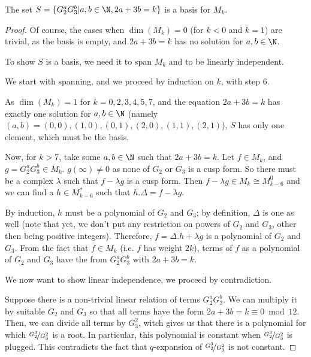 \begin{theorem}
    The set $S = \{G_2^aG_3^b | a,b \in \N, 2a+3b = k\}$ is a basis for $M_k$. \cite[Theorem 2.17]{ModularFormsComputationalApproach}
\end{theorem}
\begin{proof}
    Of course, the cases when $\dim(M_k)=0$ (for $k<0$ and $k=1$) are trivial, as the basis is empty, and $2a+3b = k$ has no solution for $a,b \in \N$.
    
    To show $S$ is a basis, we need it to span $M_k$ and to be linearly independent.
    
    We start with spanning, and we proceed by induction on $k$, with step $6$.
    
    As $\dim(M_k)=1$ for $k=0,2,3,4,5,7$, and the equation $2a+3b = k$ has exactly one solution for $a,b \in \N$ (namely $(a,b)=(0,0), (1,0), (0,1), (2,0), (1,1), (2,1)$), $S$ has only one element, which must be the basis.
    
    Now, for $k>7$, take some $a,b \in \N$ such that $2a+3b=k$. Let $f \in M_k$, and $g = G_2^aG_3^b \in M_k$.
    $g(\infty) \neq 0$ as none of $G_2$ or $G_3$ is a cusp form. 
    So there must be a complex $\lambda$ such that $f - \lambda g$ is a cusp form. 
    Then $f - \lambda g \in M_k \cong M_{k-6}^0$ and we can find a $h \in M_{k-6}^*$ such that $h.\Delta = f - \lambda g$.
    
    By induction, $h$ must be a polynomial of $G_2$ and $G_3$; by definition, $\Delta$ is one as well (note that yet, we don't put any restriction on powers of $G_2$ and $G_3$, other then being positive integers).
    Therefore, $f = \Delta.h + \lambda g$ is a polynomial of $G_2$ and $G_3$.
    From the fact that $f \in M_k$ (i.e. $f$ has weight $2k$), terms of $f$ as a polynomial of $G_2$ and $G_3$ have the from $G_2^aG_3^b$ with $2a+3b=k$.
    
    We now want to show linear independence, we proceed by contradiction.
    
    Suppose there is a non-trivial linear relation of terms $G_2^aG_3^b$. 
    We can multiply it by suitable $G_2$ and $G_3$ so that all terms have the form $2a+3b = k \equiv 0 \bmod 12$.
    Then, we can divide all terms by $G_3^2$, witch gives us that there is a polynomial for which $\nicefrac{G_2^3}{G_3^2}$ is a root.
    In particular, this polynomial is constant when $\nicefrac{G_2^3}{G_3^2}$ is plugged.
    This contradicts the fact that $q$-expansion of $\nicefrac{G_2^3}{G_3^2}$ is not constant.
\end{proof}

